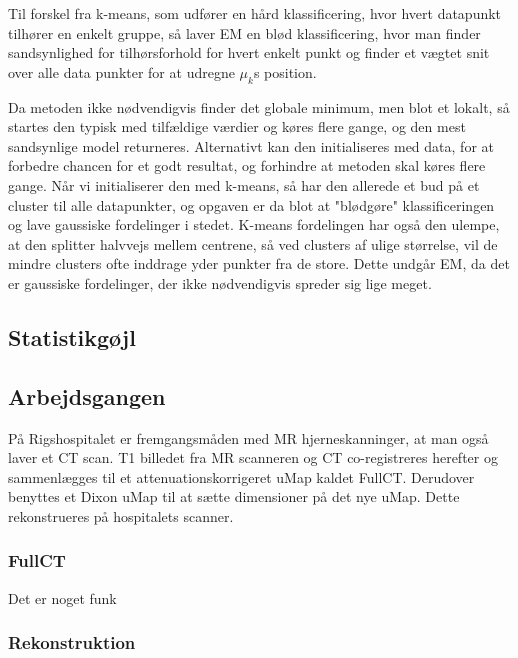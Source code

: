 Til forskel fra k-means, som udfører en hård klassificering, hvor hvert
datapunkt tilhører en enkelt gruppe, så laver EM en blød klassificering, hvor
man finder sandsynlighed for tilhørsforhold for hvert enkelt punkt og finder et
vægtet snit over alle data punkter for at udregne $\mu_k$s position.

Da metoden ikke nødvendigvis finder det globale minimum, men blot et lokalt,
så startes den typisk med tilfældige værdier og køres flere gange, og
den mest sandsynlige model returneres. Alternativt kan den initialiseres med
data, for at forbedre chancen for et godt resultat, og forhindre at metoden
skal køres flere gange. Når vi initialiserer den med k-means, så har den
allerede et bud på et cluster til alle datapunkter, og opgaven er da blot
at "blødgøre" klassificeringen og lave gaussiske fordelinger i stedet. K-means
fordelingen har også den ulempe, at den splitter halvvejs mellem centrene, så
ved clusters af ulige størrelse, vil de mindre clusters ofte inddrage yder
punkter fra de store. Dette undgår EM, da det er gaussiske fordelinger, der
ikke nødvendigvis spreder sig lige meget.


\subsection{Statistikgøjl}



\subsection{Arbejdsgangen}


På Rigshospitalet er fremgangsmåden med MR
hjerneskanninger, at man også laver et CT scan. T1 billedet fra MR scanneren
og CT co-registreres herefter og sammenlægges til et attenuationskorrigeret
uMap kaldet FullCT. Derudover benyttes et Dixon uMap til at sætte dimensioner
på det nye uMap. Dette rekonstrueres på hospitalets scanner.


\subsubsection{FullCT}


Det er noget funk

\subsubsection{Rekonstruktion}

